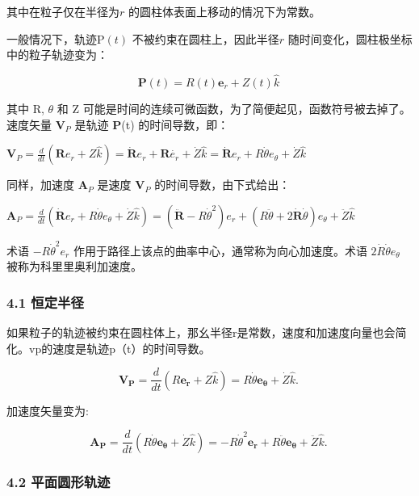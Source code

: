 其中在粒子仅在半径为$r$ 的圆柱体表面上移动的情况下为常数。

一般情况下，轨迹$\mathrm{P}(t)$ 不被约束在圆柱上，因此半径$r$ 随时间变化，圆柱极坐标中的粒子轨迹变为：

\begin{equation}
\mathbf{P}(t) = R(t)\mathbf{e}_r + Z(t)\hat{k}~
\end{equation}

其中 R, $\theta$ 和 Z  可能是时间的连续可微函数，为了简便起见，函数符号被去掉了。速度矢量 $\mathbf{V}_P $ 是轨迹 $ \mathbf{P}$(t) 的时间导数，即：

$\mathbf{V}_P = \frac{d}{dt} (\mathbf{R}e_r + Z\hat{k}) = \dot{\mathbf{R}}e_r + \mathbf{R}\dot{e_r} + \dot{Z}\hat{k} = \dot{\mathbf{R}}e_r + R\dot{\theta}e_{\theta} + \dot{Z}\hat{k}$

同样，加速度 $\mathbf{A}_P $ 是速度 $\mathbf{V}_P $ 的时间导数，由下式给出：

$\mathbf{A}_P = \frac{d}{dt} (\dot{\mathbf{R}}e_r + R\dot{\theta}e_{\theta} + \dot{Z}\hat{k}) = (\ddot{\mathbf{R}} - R\dot{\theta}^2)e_r + (R\ddot{\theta} + 2\dot{\mathbf{R}}\dot{\theta})e_{\theta} + \ddot{Z}\hat{k}$

术语 $-R\dot{\theta}^2e_r$ 作用于路径上该点的曲率中心，通常称为向心加速度。术语 $2\dot{R}\dot{\theta}e_{\theta}$ 被称为科里里奥利加速度。

\subsubsection{4.1 恒定半径}

如果粒子的轨迹被约束在圆柱体上，那幺半径r是常数，速度和加速度向量也会简化。vp的速度是轨迹p（t）的时间导数。

\begin{equation}
\mathbf{V_P} = \frac{d}{dt} \left( R \mathbf{e_r} + Z \hat{k} \right) = R \dot{\theta} \mathbf{e_{\theta}} + \dot{Z} \hat{k}.~
\end{equation}

加速度矢量变为:

\begin{equation}
\mathbf{A_P} = \frac{d}{dt} \left( R \dot{\theta} \mathbf{e_{\theta}} + \dot{Z} \hat{k} \right) = - R \dot{\theta}^2 \mathbf{e_r} + R \ddot{\theta} \mathbf{e_{\theta}} + \ddot{Z} \hat{k}.~
\end{equation}

\subsubsection{4.2 平面圆形轨迹}

